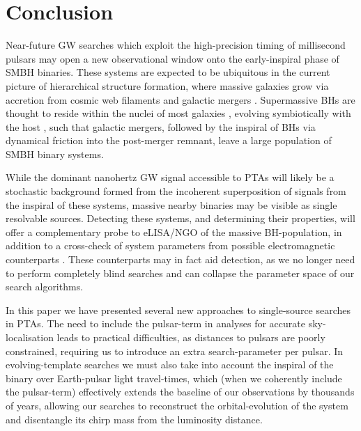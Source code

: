 \documentclass[prd,twocolumn,showpacs,nofootinbib]{revtex4}
\begin{document}
\section{Conclusion} \label{sec:singlesourceconclusions}

Near-future GW searches which exploit the high-precision timing of millisecond pulsars may open a new observational window onto the early-inspiral phase of SMBH binaries. These systems are expected to be ubiquitous in the current picture of hierarchical structure formation, where massive galaxies grow via accretion from cosmic web filaments and galactic mergers \citep{whiterees1978,kauffmann2000}. Supermassive BHs are thought to reside within the nuclei of most galaxies \citep[e.g.,][]{ferrarese2005}, evolving symbiotically with the host \citep[e.g.,][]{ferrarese2000,magorrian1998,marconi2003}, such that galactic mergers, followed by the inspiral of BHs via dynamical friction into the post-merger remnant, leave a large population of SMBH binary systems.

While the dominant nanohertz GW signal accessible to PTAs will likely be a stochastic background formed from the incoherent superposition of signals from the inspiral of these systems, massive nearby binaries may be visible as single resolvable sources. Detecting these systems, and determining their properties, will offer a complementary probe to eLISA/NGO of the massive BH-population, in addition to a cross-check of system parameters from possible electromagnetic counterparts \citep[see][and references therein]{burkespolaor2013}. These counterparts may in fact aid detection, as we no longer need to perform completely blind searches and can collapse the parameter space of our search algorithms.

In this paper we have presented several new approaches to single-source searches in PTAs. The need to include the pulsar-term in analyses for accurate sky-localisation leads to practical difficulties, as distances to pulsars are poorly constrained, requiring us to introduce an extra search-parameter per pulsar. In evolving-template searches we must also take into account the inspiral of the binary over Earth-pulsar light travel-times, which (when we coherently include the pulsar-term) effectively extends the baseline of our observations by thousands of years, allowing our searches to reconstruct the orbital-evolution of the system and disentangle its chirp mass from the luminosity distance.
\end{document}
